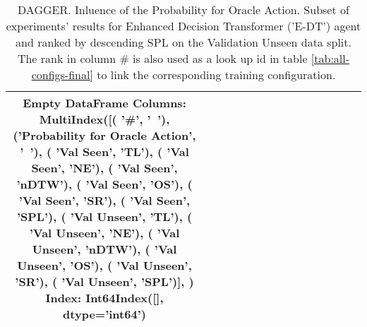 \begin{table}
\centering
\caption{\label{tab:e_dt_dagger_prob}DAGGER. Inluence of the Probability for Oracle Action. Subset of experiments' results for Enhanced Decision Transformer ('E-DT') agent and ranked by descending SPL on the Validation Unseen data split. The rank in column \# is also used as a look up id in table \ref{tab:all-configs-final} to link the corresponding training configuration.}
\begin{tabular}{@{\hskip3pt}c@{\hskip3pt}c@{\hskip3pt}c@{\hskip3pt}c@{\hskip3pt}c@{\hskip3pt}c@{\hskip3pt}c@{\hskip3pt}c@{\hskip3pt}c@{\hskip3pt}c@{\hskip3pt}c@{\hskip3pt}c@{\hskip3pt}c@{\hskip3pt}c@{\hskip3pt}c}
\toprule
Empty DataFrame
Columns: MultiIndex([(                           '\textbf{\#}',    '\textbf{~}'),
            ('\textbf{Probability for Oracle Action}',    '\textbf{~}'),
            (                     '\textbf{Val Seen}',   '\textbf{TL}'),
            (                     '\textbf{Val Seen}',   '\textbf{NE}'),
            (                     '\textbf{Val Seen}', '\textbf{nDTW}'),
            (                     '\textbf{Val Seen}',   '\textbf{OS}'),
            (                     '\textbf{Val Seen}',   '\textbf{SR}'),
            (                     '\textbf{Val Seen}',  '\textbf{SPL}'),
            (                   '\textbf{Val Unseen}',   '\textbf{TL}'),
            (                   '\textbf{Val Unseen}',   '\textbf{NE}'),
            (                   '\textbf{Val Unseen}', '\textbf{nDTW}'),
            (                   '\textbf{Val Unseen}',   '\textbf{OS}'),
            (                   '\textbf{Val Unseen}',   '\textbf{SR}'),
            (                   '\textbf{Val Unseen}',  '\textbf{SPL}')],
           )
Index: Int64Index([], dtype='int64') \\
\bottomrule
\end{tabular}
\end{table}
